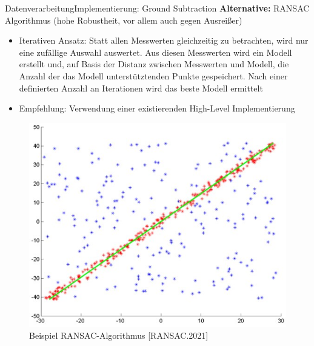 \documentclass[169, handout	]{THIbeamer} %
\begin{document}
	\begin{frame}{Datenverarbeitung}{Implementierung: Ground Subtraction}
		\footnotesize
		\textbf{Alternative:} RANSAC Algorithmus (hohe Robustheit, vor allem auch gegen Ausreißer)
		\begin{itemize}
			\item Iterativen Ansatz: Statt allen Messwerten gleichzeitig zu betrachten, wird nur eine zufällige Auswahl auswertet. Aus diesen Messwerten wird ein Modell erstellt und, auf Basis der Distanz zwischen Messwerten und Modell, die Anzahl der das Modell unterstütztenden Punkte gespeichert. Nach einer definierten Anzahl an Iterationen wird das beste Modell ermittelt
			\item Empfehlung: Verwendung einer existierenden High-Level Implementierung
		\end{itemize}

		\begin{figure}
			\includegraphics[scale=0.4]{required/RANSAC.jpg}
			\caption{Beispiel RANSAC-Algorithmus [RANSAC.2021]}
        	\label{Clustering}
		\end{figure}
	\end{frame}
\end{document}
